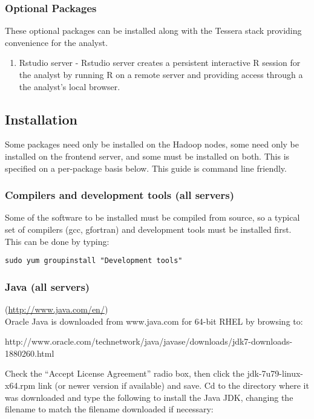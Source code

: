 \subsubsection{Optional Packages}
These optional packages can be installed along with the Tessera stack providing convenience for the analyst. 
\begin{enumerate}
\item Rstudio server - Rstudio server creates a persistent interactive R session for the analyst by running R on a remote server and providing access through a the analyst's local browser.
\end{enumerate}

\newpage

\subsection{Installation}
Some packages need only be installed on the Hadoop nodes, some need only
be installed on the frontend server, and some must be installed on both.
This is specified on a per-package basis below. This guide is command
line friendly.

\subsubsection{Compilers and development tools (all servers)}
Some of the software to be installed must be compiled from source, so a
typical set of compilers (gcc, gfortran) and development tools must
be installed first.  This can be done by typing:

\begin{verbatim}
sudo yum groupinstall "Development tools"
\end{verbatim}

\subsubsection{Java (all servers)} (\url{http://www.java.com/en/})\\
Oracle Java is downloaded from www.java.com for 64-bit RHEL by browsing to:

http://www.oracle.com/technetwork/java/javase/downloads/jdk7-downloads-1880260.html

Check the ``Accept License Agreement'' radio box, then click the
jdk-7u79-linux-x64.rpm link (or newer version if available) and save.
Cd to the directory where it was downloaded and type the following to install
the Java JDK, changing the filename to match the filename downloaded
if necessary:

